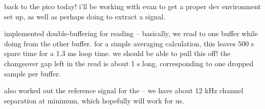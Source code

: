 back to the pico today! i'll be working with evan to get a proper dev
environment set up, as well as perhaps doing \dsp to extract a signal.

implemented double-buffering for \adc reading -- basically, we read to one
buffer while doing \dsp from the other buffer. for a simple averaging
calculation, this leaves 500 \textmu s spare time for a 1.3 ms loop time. we
should be able to pull this off! the changeover gap left in the read is about 1
\textmu s long, corresponding to one dropped sample per buffer.

also worked out the reference signal for the \pll -- we have about 12 kHz
channel separation at minimum, which hopefully will work for us.
